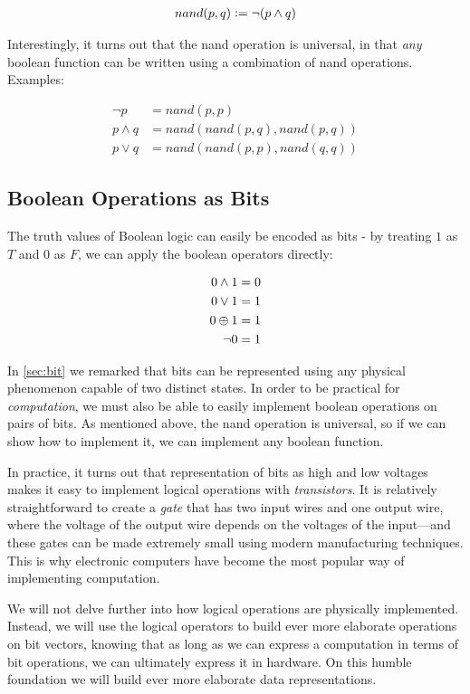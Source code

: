 \begin{align}
  nand(p,q) \vcentcolon= \neg (p \land q)
\end{align}

Interestingly, it turns out that the nand operation is universal, in
that \emph{any} boolean function can be written using a combination of
nand operations.  Examples:

\begin{align}
  \neg p &= nand(p,p) \\
  p \land q &= nand(nand(p,q),nand(p,q)) \\
  p \lor q &= nand(nand(p,p),nand(q,q))
\end{align}

\subsection{Boolean Operations as Bits}

The truth values of Boolean logic can easily be encoded as bits - by
treating $1$ as $T$ and $0$ as $F$, we can apply the boolean operators
directly:

\begin{align}
  0 \land 1 &= 0 \\
  0 \lor 1 &= 1 \\
  0 \oplus 1 &= 1 \\
  \neg 0 &= 1
\end{align}

In \cref{sec:bit} we remarked that bits can be represented using any
physical phenomenon capable of two distinct states.  In order to be
practical for \emph{computation}, we must also be able to easily
implement boolean operations on pairs of bits.  As mentioned above,
the nand operation is universal, so if we can show how to implement
it, we can implement any boolean function.

In practice, it turns out that representation of bits as high and low
voltages makes it easy to implement logical operations with
\emph{transistors}.  It is relatively straightforward to create a
\emph{gate} that has two input wires and one output wire, where the
voltage of the output wire depends on the voltages of the input---and
these gates can be made extremely small using modern manufacturing
techniques.  This is why electronic computers have become the most
popular way of implementing computation.

We will not delve further into how logical operations are physically
implemented.  Instead, we will use the logical operators to build ever
more elaborate operations on bit vectors, knowing that as long as we
can express a computation in terms of bit operations, we can
ultimately express it in hardware.  On this humble foundation we will
build ever more elaborate data representations.


